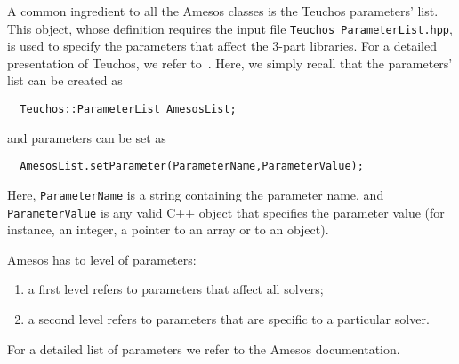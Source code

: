 A common ingredient to all the Amesos classes is the Teuchos parameters'
list. This object, whose definition requires the input file
\verb!Teuchos_ParameterList.hpp!, is used to specify the parameters that
affect the 3-part libraries. For a detailed presentation of Teuchos, we
refer to~\cite{Teuchos-home-page}. Here, we simply recall that the
parameters' list can be created as
\begin{verbatim}
  Teuchos::ParameterList AmesosList;
\end{verbatim}
and parameters can be set as
\begin{verbatim}
  AmesosList.setParameter(ParameterName,ParameterValue);
\end{verbatim}
Here, \verb!ParameterName! is a string containing the parameter name,
and \verb!ParameterValue! is any valid C++ object that specifies the
parameter value (for instance, an integer, a pointer to an array or to
an object).

Amesos has to level of parameters: 
\begin{enumerate}
\item a first level refers to parameters that affect all solvers;
\item a second level refers to parameters that are specific to a
  particular solver.
\end{enumerate}


For a detailed list of parameters we refer to the Amesos documentation.